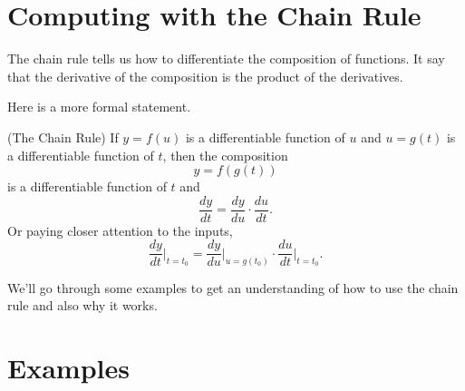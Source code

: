 \documentclass{ximera}
\begin{document}
\section{Computing with the Chain Rule}

The chain rule tells us how to differentiate the composition of functions. It say that the derivative of the composition is the product of the derivatives.

Here is a more formal statement.

\begin{theorem}
(The Chain Rule) If $y=f(u)$ is a differentiable function of $u$ and $u=g(t)$ is a differentiable function of $t$, then the composition
\[
      y = f(g(t))
\]
is a differentiable function of $t$ and
\[
   \frac{dy}{dt} = \frac{dy}{du} \cdot \frac{du}{dt} .
\]
Or paying closer attention to the inputs,
\[
      \frac{dy}{dt}\Big|_{t=t_0} = \frac{dy}{du}\Big|_{u=g(t_0)} \cdot \frac{du}{dt}\Big|_{t=t_0} . 
\]

\end{theorem}


We'll go through some examples to get an understanding of how to use the chain rule and also why it works.


\section*{Examples}
\end{document}
